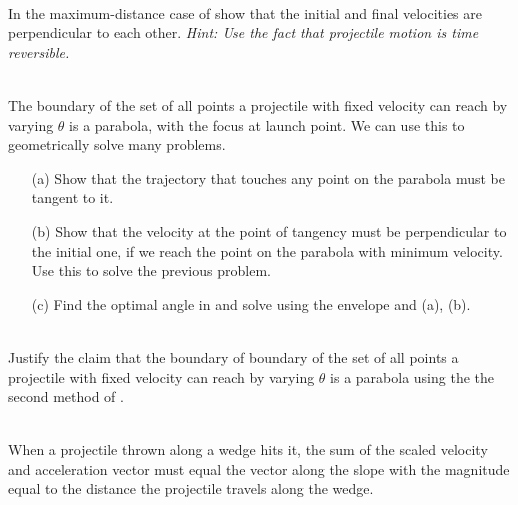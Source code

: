 \begin{exc}
        \begin{exercise}[subtitle={Perpendicular Velocities, Morin}, points = 3]
            \smallskip
            ~\\
            In the maximum-distance case of 
            show that the initial and final velocities are perpendicular to each other. \emph{Hint: Use the fact 
            that projectile motion is time reversible.}
        \end{exercise}

        \begin{exercise}[subtitle={Parabolic Envelope, Knzhou}, points = 5]
            \smallskip
            ~\\
            The boundary of the set of all points a projectile with fixed velocity can reach by varying $\theta$ is 
            a parabola, with the focus at launch point. We can use this to geometrically solve many problems.
            \begin{enumerate}
                \item[(a)] Show that the trajectory that touches any point on the parabola must be tangent to it.
                \item[(b)] Show that the velocity at the point of tangency must be perpendicular to the initial one, if 
                we reach the point on the parabola with minimum velocity. Use this to solve the previous problem.
                \item[(c)]  Find the optimal angle in  and solve 
                using the envelope and (a), (b). 
            \end{enumerate}
        \end{exercise}

        \begin{exercise}[subtitle={Parabolic Envelope}, points = 3]
        \smallskip
        ~\\
        Justify the claim that the boundary of boundary of the set of all points a projectile with fixed velocity can reach by varying $\theta$ is 
        a parabola using the the second method of .
        \end{exercise}

        \begin{exercise}[subtitle={Projectiles with Vector, V2.}, points = 3]
            \smallskip
            ~\\
            When a projectile thrown along a wedge hits it, the sum of the scaled velocity and acceleration vector 
            must equal the vector along the slope with the magnitude equal to the distance the projectile travels 
            along the wedge. 
            

\end{exercise}
\end{exc}
